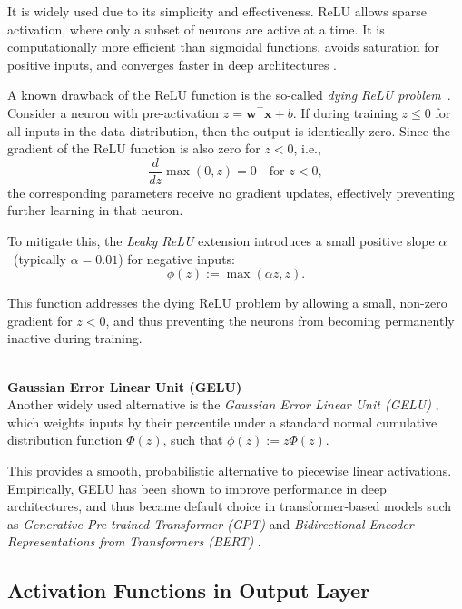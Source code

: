 It is widely used due to its simplicity and effectiveness. ReLU allows sparse activation, where only a subset of neurons are active at a time. It is computationally more efficient than sigmoidal functions, avoids saturation for positive inputs, and converges faster in deep architectures \cite{aggarwal2018}. 

A known drawback of the ReLU function is the so-called \emph{dying ReLU problem}~\cite{nair2010relu}. Consider a neuron with pre-activation $z = \mathbf{w}^\top \mathbf{x} + b$. If during training $z \leq 0$ for all inputs in the data distribution, then the output is identically zero. Since the gradient of the ReLU function is also zero for $z < 0$, i.e.,
\begin{equation*}
\frac{d}{dz} \max(0, z) = 0 \quad \text{for } z < 0,
\end{equation*}
the corresponding parameters receive no gradient updates, effectively preventing further learning in that neuron.

To mitigate this, the \textit{Leaky ReLU} extension introduces a small positive \break slope $\alpha$~(typically $\alpha = 0.01$) for negative inputs:
\begin{equation*}
\phi(z) := \max(\alpha z, z).
\end{equation*}

This function addresses the dying ReLU problem by allowing a small, non-zero gradient for $z < 0$, and thus preventing the neurons from becoming permanently inactive during training.

\textbf{\\Gaussian Error Linear Unit (GELU)\\}
Another widely used alternative is the \textit{Gaussian Error Linear Unit (GELU)} \cite{hendrycks2016}, which weights inputs by their percentile under a standard normal cumulative distribution function $\Phi(z)$, such that $\phi(z) := z\Phi(z)$.

This provides a smooth, probabilistic alternative to piecewise linear activations. Empirically, GELU has been shown to improve performance in deep architectures, and thus became default choice in transformer-based models such as \textit{Generative Pre-trained Transformer (GPT)} \cite{radford2019} and \textit{Bidirectional Encoder Representations from Transformers (BERT)} \cite{devlin2018}.

\subsection{Activation Functions in Output Layer}
\label{subsec:activation-functions-ouput-layer}

